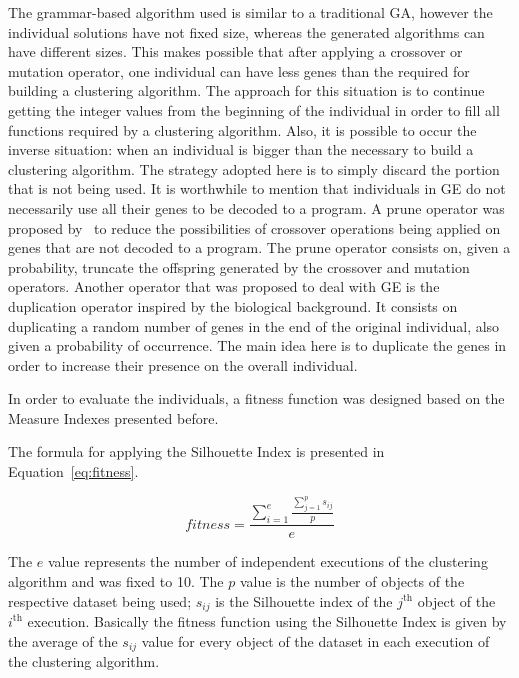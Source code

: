 \documentclass[conference]{IEEEtran}
\begin{document}
	
	The grammar-based algorithm used is similar to a traditional GA, however the individual solutions have not fixed size, whereas the generated algorithms can have different sizes. This makes possible that after applying a crossover or mutation operator, one individual can have less genes than the required for building a clustering algorithm. The approach for this situation is to continue getting the integer values from the beginning of the individual in order to fill all functions required by a clustering algorithm. Also, it is possible to occur the inverse situation: when an individual is bigger than the necessary to build a clustering algorithm. The strategy adopted here is to simply discard the portion that is not being used. It is worthwhile to mention that individuals in GE do not necessarily use all their genes to be decoded to a program. A prune operator was proposed by~\cite{ryan1998grammatical} to reduce the possibilities of crossover operations being applied on genes that are not decoded to a program. The prune operator consists on, given a probability, truncate the offspring generated by the crossover and mutation operators. Another operator that was proposed to deal with GE is the duplication operator inspired by the biological background. It consists on duplicating a random number of genes in the end of the original individual, also given a probability of occurrence. The main idea here is to duplicate the genes in order to increase their presence on the overall individual.
	
	
	In order to evaluate the individuals, a fitness function was designed based on the Measure Indexes presented before.
	
	
	The formula for applying the Silhouette Index is presented in Equation~\ref{eq:fitness}.
	
	
	\begin{equation} \label{eq:fitness}
		fitness = \frac{\sum_{i=1}^e \frac{\sum_{j=1}^{p} s_{ij}}{p}}{e}
	\end{equation}
	
	
	The $e$ value represents the number of independent executions of the clustering algorithm and was fixed to 10. The $p$ value is the number of objects of the respective dataset being used; $s_{ij}$ is the Silhouette index of the $j^{\text{th}}$ object of the $i^{\text{th}}$ execution. Basically the fitness function using the Silhouette Index is given by the average of the $s_{ij}$ value for every object of the dataset in each execution of the clustering algorithm.
	
\end{document}
